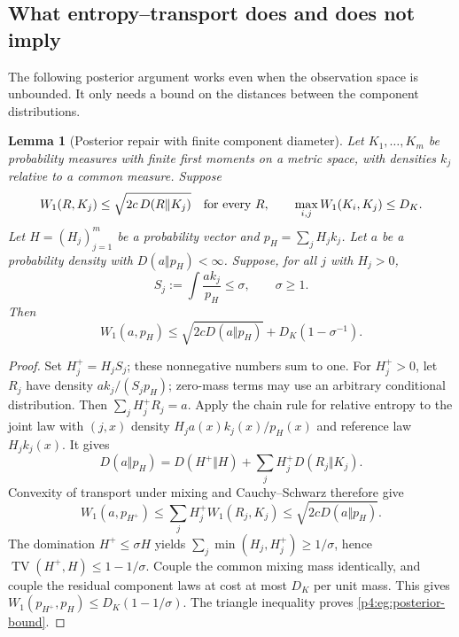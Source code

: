 \documentclass[11pt,a4paper]{article}
\newtheorem{lemma}[theorem]{Lemma}
\theoremstyle{definition}
\theoremstyle{remark}
\numberwithin{equation}{section}
\begin{document}
\subsection{What entropy--transport does and does not imply}

The following posterior argument works even when the observation
space is unbounded. It only needs a bound on the distances between
the component distributions.

\begin{lemma}[Posterior repair with finite component diameter]
\label{p4:eg:posterior}
Let $K_1,\ldots,K_m$ be probability measures with finite first moments
on a metric space, with densities $k_j$ relative to a common measure. Suppose
\[
 W_1(R,K_j)\le\sqrt{2c\,D(R\Vert K_j)}
 \quad\hbox{for every }R,\qquad
 \max_{i,j}W_1(K_i,K_j)\le D_K.
\]
Let $H=(H_j)_{j=1}^m$ be a probability vector and
$p_H=\sum_jH_jk_j$. Let $a$ be a probability density with
$D(a\Vert p_H)<\infty$. Suppose, for all $j$ with $H_j>0$,
\[
 S_j:=\int\frac{a k_j}{p_H}\le\sigma,\qquad \sigma\ge1.
\]
Then
\begin{equation}\label{p4:eg:posterior-bound}
 W_1(a,p_H)\le
 \sqrt{2cD(a\Vert p_H)}+D_K(1-\sigma^{-1}).
\end{equation}
\end{lemma}

\begin{proof}
Set $H_j^+=H_jS_j$; these nonnegative numbers sum to one.
For $H_j^+>0$, let $R_j$ have density
$a k_j/(S_jp_H)$; zero-mass terms may use an arbitrary
conditional distribution. Then $\sum_jH_j^+R_j=a$.
Apply the chain rule for relative entropy to the joint law with
$(j,x)$ density $H_j a(x)k_j(x)/p_H(x)$ and reference law
$H_j k_j(x)$. It gives
\[
 D(a\Vert p_H)=D(H^+\Vert H)
        +\sum_jH_j^+D(R_j\Vert K_j).
\]
Convexity of transport under mixing and Cauchy--Schwarz therefore
give
\[
 W_1(a,p_{H^+})
 \le\sum_jH_j^+W_1(R_j,K_j)
 \le\sqrt{2cD(a\Vert p_H)}.
\]
The domination $H^+\le\sigma H$ yields
$\sum_j\min(H_j,H_j^+)\ge1/\sigma$, hence
$\operatorname{TV}(H^+,H)\le1-1/\sigma$.
Couple the common mixing mass identically, and couple the residual
component laws at cost at most $D_K$ per unit mass. This gives
$W_1(p_{H^+},p_H)\le D_K(1-1/\sigma)$.
The triangle inequality proves \eqref{p4:eg:posterior-bound}.
\end{proof}
\end{document}
